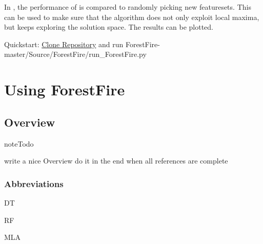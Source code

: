 \documentclass[letterpaper,10pt,english]{sphinxmanual}
\begin{document}
In , the performance of  is compared to randomly picking new featuresets.
This can be used to make sure that the algorithm does not only exploit local maxima, but keeps exploring the 
solution space.
The results can be plotted.

Quickstart: \href{https://github.com/weinertmos/ForestFire}{Clone Repository} and run ForestFire-master/Source/ForestFire/run\_ForestFire.py


\chapter{Using ForestFire}
\label{\detokenize{index:get-started}}\label{\detokenize{index:using-forestfire}}

\section{Overview}
\label{\detokenize{Overview:overview}}\label{\detokenize{Overview::doc}}\label{\detokenize{Overview:id1}}
\begin{sphinxadmonition}{note}{Todo}

write a nice Overview
do it in the end when all references are complete
\end{sphinxadmonition}


\subsection{Abbreviations}
\label{\detokenize{Overview:abbreviations}}\label{\detokenize{Overview:dt}}\begin{description}
\item[{DT}] \leavevmode
{\hyperref[\detokenize{Overview:term-decision-tree}]{}}

\end{description}
\label{\detokenize{Overview:rf}}\begin{description}
\item[{RF}] \leavevmode
{\hyperref[\detokenize{Overview:term-random-forest}]{}}

\end{description}
\label{\detokenize{Overview:mla}}\begin{description}
\item[{MLA}] \leavevmode
{}

\end{description}
\end{document}
